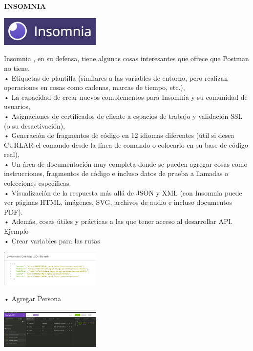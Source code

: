 \documentclass[twoside,twocolumn]{article}
\begin{document}
\textbf{INSOMNIA}\\
\begin{center}
	\includegraphics[width=5cm]{./img/12.png} 
\end{center}
Insomnia , en su defensa, tiene algunas cosas interesantes que ofrece que Postman no tiene.
\\•	Etiquetas de plantilla (similares a las variables de entorno, pero realizan operaciones en cosas como cadenas, marcas de tiempo, etc.),
\\•	La capacidad de crear nuevos complementos para Insomnia y su comunidad de usuarios,
\\•	Asignaciones de certificados de cliente a espacios de trabajo y validación SSL (o su desactivación),
\\•	Generación de fragmentos de código en 12 idiomas diferentes (útil si desea CURLAR el comando desde la línea de comando o colocarlo en su base de código real),
\\•	Un área de documentación muy completa donde se pueden agregar cosas como instrucciones, fragmentos de código e incluso datos de prueba a llamadas o colecciones específicas.
\\•	Visualización de la respuesta más allá de JSON y XML (con Insomnia puede ver páginas HTML, imágenes, SVG, archivos de audio e incluso documentos PDF).
\\•	Además, cosas útiles y prácticas a las que tener acceso al desarrollar API.
\\Ejemplo
\\•	Crear variables para las rutas
\begin{center}
	\includegraphics[width=5cm]{./img/13.png} 
\end{center}

•	Agregar Persona
\begin{center}
	\includegraphics[width=5cm]{./img/14.png} 
\end{center}
\end{document}
